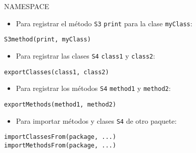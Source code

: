 \documentclass[xcolor={usenames,svgnames,dvipsnames}]{beamer}
\begin{document}
\begin{frame}[fragile,label={sec:org0e8d0db}]{NAMESPACE}
 \begin{itemize}
\item Para registrar el método \texttt{S3} \texttt{print} para la clase \texttt{myClass}:
\end{itemize}
\lstset{language=r,label= ,caption= ,captionpos=b,numbers=none}
\begin{lstlisting}
S3method(print, myClass)
\end{lstlisting}
\begin{itemize}
\item Para registrar las clases \texttt{S4} \texttt{class1} y \texttt{class2}:
\end{itemize}
\lstset{language=r,label= ,caption= ,captionpos=b,numbers=none}
\begin{lstlisting}
exportClasses(class1, class2)
\end{lstlisting}
\begin{itemize}
\item Para registrar los métodos \texttt{S4} \texttt{method1} y \texttt{method2}:
\end{itemize}
\lstset{language=r,label= ,caption= ,captionpos=b,numbers=none}
\begin{lstlisting}
exportMethods(method1, method2)
\end{lstlisting}
\begin{itemize}
\item Para importar métodos y clases \texttt{S4} de otro paquete:
\end{itemize}
\lstset{language=r,label= ,caption= ,captionpos=b,numbers=none}
\begin{lstlisting}
importClassesFrom(package, ...)
importMethodsFrom(package, ...)
\end{lstlisting}
\end{frame}
\end{document}

